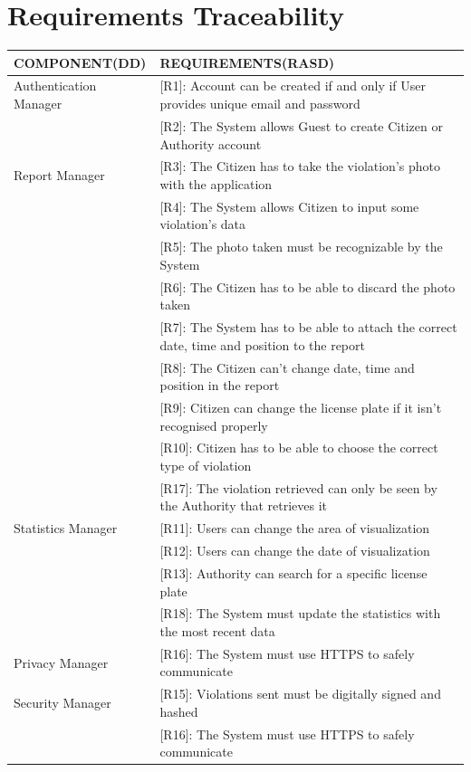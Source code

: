 \documentclass{article}
\begin{document}
\section{Requirements Traceability}
\begin{center}
    \begin{tabular}{ | l | l |}
        \hline
        COMPONENT(DD) & REQUIREMENTS(RASD) \\
        \hline
        Authentication Manager & [R1]: Account can be created if and only if User provides unique email and password \\
                               & [R2]: The System allows Guest to create Citizen or Authority account \\
        \hline
        Report Manager  & [R3]: The Citizen has to take the violation’s photo with the application \\
                        & [R4]: The System allows Citizen to input some violation’s data \\
                        & [R5]: The photo taken must be recognizable by the System \\
                        & [R6]: The Citizen has to be able to discard the photo taken \\
                        & [R7]: The System has to be able to attach the correct date, time and position to the report \\
                        & [R8]: The Citizen can’t change date, time and position in the report \\ 
                        & [R9]: Citizen can change the license plate if it isn’t recognised properly \\
                        & [R10]: Citizen has to be able to choose the correct type of violation \\
                        & [R17]: The violation retrieved can only be seen by the Authority that retrieves it \\
        \hline
        Statistics Manager & [R11]: Users can change the area of visualization \\
                           & [R12]: Users can change the date of visualization \\
                           & [R13]: Authority can search for a specific license plate \\
                           & [R18]: The System must update the statistics with the most recent data \\
        \hline
        Privacy Manager & [R16]: The System must use HTTPS to safely communicate \\

        \hline
        Security Manager & [R15]: Violations sent must be digitally signed and hashed \\
                         & [R16]: The System must use HTTPS to safely communicate \\
        \hline
    \end{tabular}
    \end{center}
\end{document}
